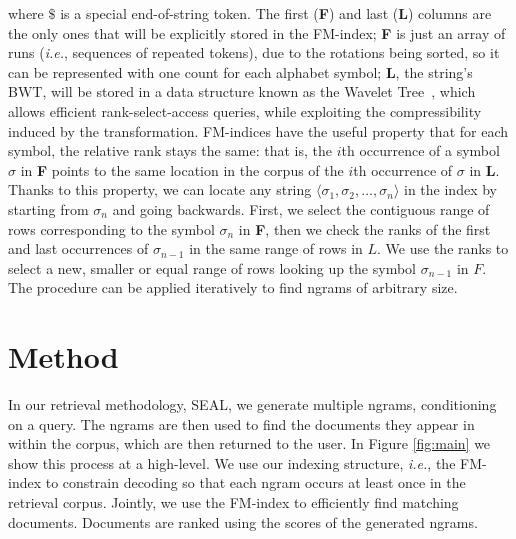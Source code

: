 \documentclass[11pt]{article}
\newcommand{\ie}{\textit{i.e.}}
\newcommand{\system}{\textsc{SEAL}}
\begin{document}
\noindent where $\$$ is a special end-of-string token. 
The first (\textbf{F}) and last (\textbf{L}) columns are the only ones that will be explicitly stored in the FM-index; \textbf{F} is just an array of runs (\ie, sequences of repeated tokens), due to the rotations being sorted, so it can be represented with one count for each alphabet symbol; \textbf{L}, the string's BWT, will be stored in a data structure known as the Wavelet Tree~\citep{grossi-etal-2003-highorder}, which allows efficient rank-select-access queries, while exploiting the compressibility induced by the transformation.
FM-indices have the useful property that for each symbol, the relative rank stays the same: that is, the $i$th occurrence of a symbol $\sigma$ in \textbf{F} points to the same location in the corpus of the $i$th occurrence of $\sigma$ in \textbf{L}. Thanks to this property, we can locate any string $\langle \sigma_1 , \sigma_2 , \dots , \sigma_n \rangle$ in the index by starting from $\sigma_n$ and going backwards. First, we select the contiguous range of rows corresponding to the symbol $\sigma_n$ in \textbf{F}, then we check the ranks of the first and last occurrences of $\sigma_{n-1}$ in the same range of rows in $L$. We use the ranks to select a new, smaller or equal range of rows looking up the symbol $\sigma_{n-1}$ in $F$. The procedure can be applied iteratively to find ngrams of arbitrary size.


\section{Method}
\label{sec:method}
In our retrieval methodology, \system{}, we generate multiple ngrams, conditioning on a query. The ngrams are then used to find the documents they appear in within the corpus, which are then returned to the user. In Figure \ref{fig:main} we show this process at a high-level. We use our indexing structure, \ie, the FM-index to constrain decoding so that each ngram occurs at least once in the retrieval corpus. Jointly, we use the FM-index to efficiently find matching documents. Documents are ranked using the scores of the generated ngrams. 
\end{document}
